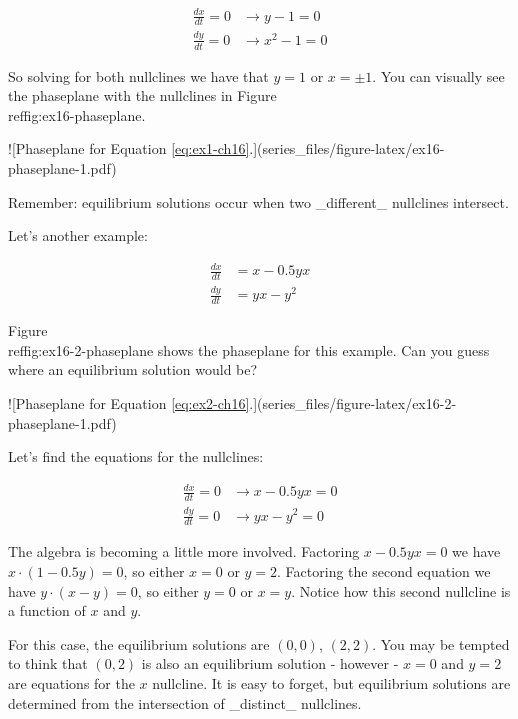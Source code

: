 \documentclass[
]{book}
\theoremstyle{definition}
\theoremstyle{definition}
\theoremstyle{definition}
\theoremstyle{remark}
\begin{document}
\begin{equation}
\begin{split} 
\frac{dx}{dt} = 0 &\rightarrow y-1 = 0\\  \label{eq:ex1-ch16}
\frac{dy}{dt} = 0 & \rightarrow x^{2}-1 = 0
\end{split}
\end{equation}

So solving for both nullclines we have that $y=1$ or $x = \pm 1$.  You can visually see the phaseplane with the nullclines in Figure \\ref{fig:ex16-phaseplane}.

![\label{fig:ex16-phaseplane}Phaseplane for Equation \ref{eq:ex1-ch16}.](series_files/figure-latex/ex16-phaseplane-1.pdf) 

Remember: equilibrium solutions occur when two _different_ nullclines intersect.

Let's another example:

\begin{equation}
\begin{split} 
\frac{dx}{dt} &= x-0.5yx \\  \label{eq:ex2-ch16}
\frac{dy}{dt} &= yx -y^{2} 
\end{split}
\end{equation}

Figure \\ref{fig:ex16-2-phaseplane} shows the phaseplane for this example.  Can you guess where an equilibrium solution would be?

![\label{fig:ex16-2-phaseplane}Phaseplane for Equation \ref{eq:ex2-ch16}.](series_files/figure-latex/ex16-2-phaseplane-1.pdf) 

Let's find the equations for the nullclines:

\begin{equation}
\begin{split} 
\frac{dx}{dt} = 0 & \rightarrow x-0.5yx = 0 \\  
\frac{dy}{dt} = 0 & \rightarrow yx -y^{2} = 0
\end{split}
\end{equation}

The algebra is becoming a little more involved.  Factoring $x-0.5yx = 0$ we have $x \cdot (1 - 0.5 y) = 0$, so either $x=0$ or $y=2$.  Factoring the second equation we have $y \cdot (x - y) = 0$, so either $y=0$ or $x=y$.  Notice how this second nullcline is a function of $x$ and $y$.

For this case, the equilibrium solutions are $(0,0)$, $(2,2)$.  You may be tempted to think that $(0,2)$ is also an equilibrium solution - however - $x=0$ and $y=2$ are equations for the $x$ nullcline.  It is easy to forget, but equilibrium solutions are determined from the intersection of _distinct_ nullclines.
\end{document}
